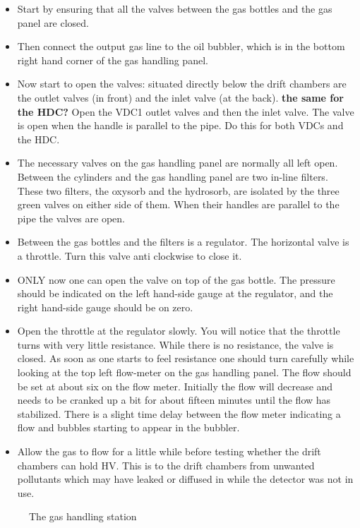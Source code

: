 \documentclass[11pt]{report}
\begin{document}
\begin{itemize}
\item Start by ensuring that all the valves between the gas bottles and 
the gas panel are closed.
\item Then connect the output gas line to the oil bubbler,
which is in the bottom right hand corner of the gas handling panel. 
\item Now start to open the valves: situated directly below the drift 
chambers are the outlet valves (in front) and the inlet valve (at the back). 
{\bf the same for the HDC?}
Open the VDC1 outlet valves and then the 
inlet valve. The valve is open when the handle is parallel to the pipe. 
Do this for both VDCs and the HDC.
\item The necessary valves on the gas handling panel are normally all left 
open. Between the cylinders and the gas handling panel are two in-line
filters. These two filters, the oxysorb and the hydrosorb, 
are isolated by the three green valves on either side of them. When 
their handles are parallel to the pipe the valves are open.
\item Between the gas bottles and the filters is a regulator. The horizontal
valve is a throttle. Turn this valve anti clockwise 
to close it. 
\item ONLY now one can open the valve on top of the gas bottle. The
pressure should be indicated on the left hand-side gauge at the regulator,
and the right
hand-side gauge should be on zero. 
\item Open the throttle at the regulator slowly. You will  
notice that the throttle turns with very little resistance. While there
is no resistance, the valve is closed. As soon as one starts to feel
resistance one should turn carefully while looking at the top left
flow-meter on the gas handling panel. The flow should be set at about
six on the flow meter. Initially the flow will decrease and needs to be 
cranked up a bit for about fifteen minutes until the flow has stabilized. 
There is a slight time delay between the flow meter indicating a flow and 
bubbles starting to appear in the bubbler.
\item Allow the gas to flow for a little while before testing whether the drift chambers can hold HV.
This is to the drift chambers from unwanted pollutants which may have leaked or 
diffused in while the detector was not in use.
\end{itemize}


\begin{figure}[!ht]
\centerline{\vspace{0cm}\hspace{0cm}
}
\centering
\caption{The gas handling station}
\label{fig:gas-handling-pic}
\end{figure} 
\end{document}

